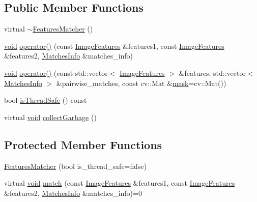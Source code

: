 \subsection*{Public Member Functions}
\begin{DoxyCompactItemize}
\item 
virtual \hyperlink{classcv_1_1detail_1_1FeaturesMatcher_a7e0caef3c78089b3311eca9a3be06d95}{$\sim$\-Features\-Matcher} ()
\item 
\hyperlink{legacy_8hpp_a8bb47f092d473522721002c86c13b94e}{void} \hyperlink{classcv_1_1detail_1_1FeaturesMatcher_a5d5793f2f71bae1cb72acc3e95d069df}{operator()} (const \hyperlink{structcv_1_1detail_1_1ImageFeatures}{Image\-Features} \&features1, const \hyperlink{structcv_1_1detail_1_1ImageFeatures}{Image\-Features} \&features2, \hyperlink{structcv_1_1detail_1_1MatchesInfo}{Matches\-Info} \&matches\-\_\-info)
\item 
\hyperlink{legacy_8hpp_a8bb47f092d473522721002c86c13b94e}{void} \hyperlink{classcv_1_1detail_1_1FeaturesMatcher_a6ce148cc528537d6dfb5d07aea6a0337}{operator()} (const std\-::vector$<$ \hyperlink{structcv_1_1detail_1_1ImageFeatures}{Image\-Features} $>$ \&features, std\-::vector$<$ \hyperlink{structcv_1_1detail_1_1MatchesInfo}{Matches\-Info} $>$ \&pairwise\-\_\-matches, const cv\-::\-Mat \&\hyperlink{tracking_8hpp_a6b13ecd2fd6ec7ad422f1d7863c3ad19}{mask}=cv\-::\-Mat())
\item 
bool \hyperlink{classcv_1_1detail_1_1FeaturesMatcher_a0447c45b6a9aca348fdc4872665c3dcb}{is\-Thread\-Safe} () const 
\item 
virtual \hyperlink{legacy_8hpp_a8bb47f092d473522721002c86c13b94e}{void} \hyperlink{classcv_1_1detail_1_1FeaturesMatcher_a8520ff70e51e0bb138891ce410abf6e4}{collect\-Garbage} ()
\end{DoxyCompactItemize}
\subsection*{Protected Member Functions}
\begin{DoxyCompactItemize}
\item 
\hyperlink{classcv_1_1detail_1_1FeaturesMatcher_a24ba277980b3f2d220f2a0b01c527569}{Features\-Matcher} (bool is\-\_\-thread\-\_\-safe=false)
\item 
virtual \hyperlink{legacy_8hpp_a8bb47f092d473522721002c86c13b94e}{void} \hyperlink{classcv_1_1detail_1_1FeaturesMatcher_a22005bcc8bf637398b2a325121b44bb1}{match} (const \hyperlink{structcv_1_1detail_1_1ImageFeatures}{Image\-Features} \&features1, const \hyperlink{structcv_1_1detail_1_1ImageFeatures}{Image\-Features} \&features2, \hyperlink{structcv_1_1detail_1_1MatchesInfo}{Matches\-Info} \&matches\-\_\-info)=0
\end{DoxyCompactItemize}
